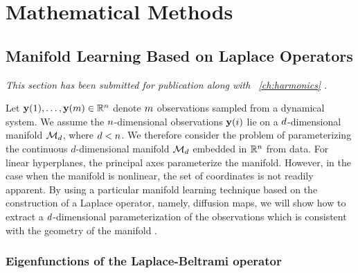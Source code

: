 
\graphicspath{{ch-math/figures/}}

\chapter{Mathematical Methods}\label{ch:math}


\section{Manifold Learning Based on Laplace Operators} \label{sec:manifold_learning}

{\em This section has been submitted for publication along with \chap~\ref{ch:harmonics} \cite{dsilva2015parsimonious}}.
%
%

Let $\mathbf{y}(1), \dots, \mathbf{y}(m) \in \mathbb{R}^n$ denote $m$ observations sampled from a dynamical system.
%
We assume the $n$-dimensional observations $\mathbf{y}(i)$ lie on a $d$-dimensional manifold $\mathcal{M}_d$, where $d < n$.
%
We therefore consider the problem of parameterizing the continuous $d$-dimensional manifold $\mathcal{M}_d$ embedded in $\mathbb{R}^n$ from data.
%
For linear hyperplanes, the principal axes parameterize the manifold.
%
However, in the case when the manifold is nonlinear, the set of coordinates is not readily apparent.
%
By using a particular manifold learning technique based on the construction of a Laplace operator, namely, diffusion maps, we will show how to extract a $d$-dimensional parameterization of the observations which is consistent with the geometry of the manifold \cite{Belkin2003, coifman2005geometric, singer2008non}.

\subsection{Eigenfunctions of the Laplace-Beltrami operator}


